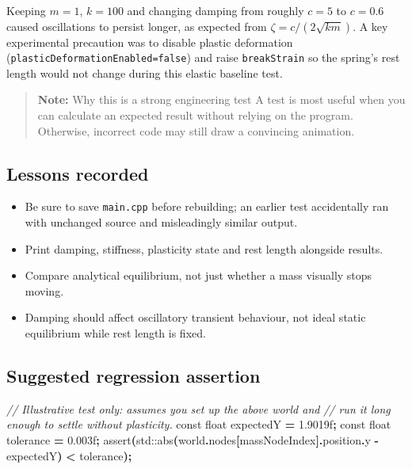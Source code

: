 \documentclass[
  10pt,
  a4paper,
]{article}
\newenvironment{Shaded}{\begin{snugshade}}{\end{snugshade}}
\newcommand{\AttributeTok}[1]{\textcolor[rgb]{0.13,0.29,0.53}{#1}}
\newcommand{\BuiltInTok}[1]{#1}
\newcommand{\CommentTok}[1]{\textcolor[rgb]{0.56,0.35,0.01}{\textit{#1}}}
\newcommand{\DataTypeTok}[1]{\textcolor[rgb]{0.13,0.29,0.53}{#1}}
\newcommand{\FloatTok}[1]{\textcolor[rgb]{0.00,0.00,0.81}{#1}}
\newcommand{\NormalTok}[1]{#1}
\newcommand{\OperatorTok}[1]{\textcolor[rgb]{0.81,0.36,0.00}{\textbf{#1}}}
\newcommand{\OtherTok}[1]{\textcolor[rgb]{0.56,0.35,0.01}{#1}}
\providecommand{\tightlist}{%
  \setlength{\itemsep}{0pt}\setlength{\parskip}{0pt}}
\begin{document}
Keeping \(m=1\), \(k=100\) and changing damping from roughly \(c=5\) to
\(c=0.6\) caused oscillations to persist longer, as expected from
\(\zeta=c/(2\sqrt{km})\). A key experimental precaution was to disable
plastic deformation (\texttt{plasticDeformationEnabled=false}) and raise
\texttt{breakStrain} so the spring's rest length would not change during
this elastic baseline test.

\begin{quote}
\textbf{Note:} Why this is a strong engineering test A test is most
useful when you can calculate an expected result without relying on the
program. Otherwise, incorrect code may still draw a convincing
animation.
\end{quote}

\subsection{Lessons recorded}\label{lessons-recorded}

\begin{itemize}
\tightlist
\item
  Be sure to save \texttt{main.cpp} before rebuilding; an earlier test
  accidentally ran with unchanged source and misleadingly similar
  output.
\item
  Print damping, stiffness, plasticity state and rest length alongside
  results.
\item
  Compare analytical equilibrium, not just whether a mass visually stops
  moving.
\item
  Damping should affect oscillatory transient behaviour, not ideal
  static equilibrium while rest length is fixed.
\end{itemize}

\subsection{Suggested regression
assertion}\label{suggested-regression-assertion}

\begin{Shaded}
\begin{Highlighting}[]
\CommentTok{// Illustrative test only: assumes you set up the above world and}
\CommentTok{// run it long enough to settle without plasticity.}
\AttributeTok{const} \DataTypeTok{float}\NormalTok{ expectedY }\OperatorTok{=} \FloatTok{1.9019}\BuiltInTok{f}\OperatorTok{;}
\AttributeTok{const} \DataTypeTok{float}\NormalTok{ tolerance }\OperatorTok{=} \FloatTok{0.003}\BuiltInTok{f}\OperatorTok{;}
\OtherTok{assert}\OperatorTok{(}\BuiltInTok{std::}\NormalTok{abs}\OperatorTok{(}\NormalTok{world}\OperatorTok{.}\NormalTok{nodes}\OperatorTok{[}\NormalTok{massNodeIndex}\OperatorTok{].}\NormalTok{position}\OperatorTok{.}\NormalTok{y }\OperatorTok{{-}}\NormalTok{ expectedY}\OperatorTok{)} \OperatorTok{\textless{}}\NormalTok{ tolerance}\OperatorTok{);}
\end{Highlighting}
\end{Shaded}
\end{document}
